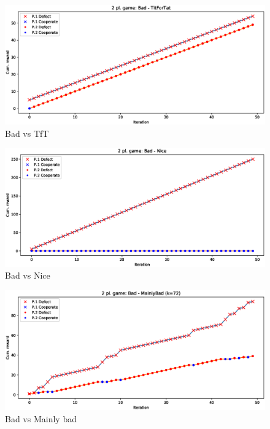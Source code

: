 \documentclass[journal,a4paper,10pt,twoside]{IEEEtran} %
\begin{document}
\begin{figure}[!ht]
    \centering
    \includegraphics[width=1\columnwidth]{../img/ipd2p/ipd2p-rewards-Bad-TitForTat}
    \caption{Bad vs TfT}
    \label{fig:badvstft}
\end{figure}

\begin{figure}[!ht]
    \centering
    \includegraphics[width=1\columnwidth]{../img/ipd2p/ipd2p-rewards-Bad-Nice}
    \caption{Bad vs Nice}
    \label{fig:badvsnice}
\end{figure}

\begin{figure}[!ht]
    \centering
    \includegraphics[width=1\columnwidth]{../img/ipd2p/ipd2p-rewards-Bad-MainlyBad(k=72)}
    \caption{Bad vs Mainly bad}
    \label{fig:badvsmainlybad}
\end{figure}
\end{document}
